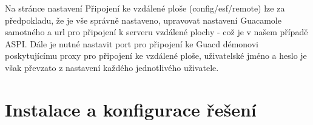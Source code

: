 Na stránce nastavení Připojení ke vzdálené ploše (config/esf/remote) lze za předpokladu, že je vše správně nastaveno, upravovat nastavení Guacamole samotného a url pro připojení k serveru vzdálené plochy - což je v našem případě ASPI. Dále je nutné nastavit port pro připojení ke Guacd démonovi poskytujícímu proxy pro připojení ke vzdálené ploše, uživatelské jméno a heslo je však převzato z nastavení každého jednotlivého uživatele.

\section{Instalace a konfigurace řešení}
